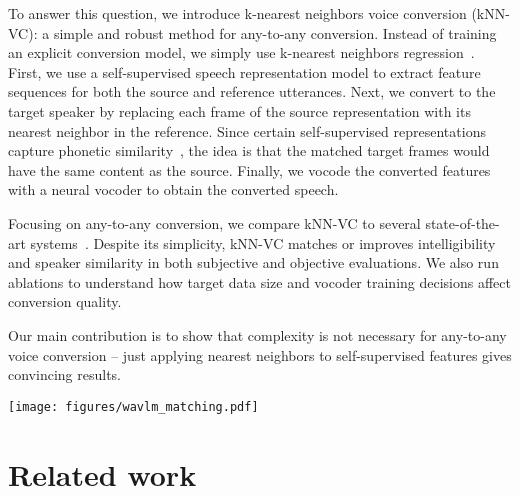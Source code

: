 \documentclass{INTERSPEECH2023}
\def\modelname{{kNN-VC}}
\begin{document}
To answer this question, we introduce k-nearest neighbors voice conversion (\modelname{}): a simple and robust method for any-to-any conversion.
Instead of training an explicit conversion model, we simply use k-nearest neighbors regression~\cite{knn_fix1985discriminatory}.
First, we use a self-supervised speech representation
model to extract feature sequences for both the source and reference utterances.
Next, we convert to the target speaker by replacing each frame of the source representation with its nearest neighbor in the reference.
Since certain self-supervised representations capture phonetic similarity~\cite{chen2022wavlm}, the idea is that the matched target frames would have the same content as the source.
Finally, we vocode the converted features with a neural vocoder to obtain the converted speech.




Focusing on any-to-any conversion, we compare \modelname{} to several state-of-the-art systems~\cite{freevc, vqmivc_wang21n_interspeech,yourtts_v162-casanova22a}.
Despite its simplicity, \modelname{} matches or improves intelligibility and speaker similarity in both subjective and objective evaluations. 
We also run ablations to understand how target data size and vocoder training decisions affect conversion quality.


Our main contribution is to show that complexity is not necessary for any-to-any voice conversion -- just applying nearest neighbors to self-supervised features gives convincing results.





\begin{figure*}[t!]
\centering
\centerline{\texttt{[image: figures/wavlm\_matching.pdf]}}
\caption{
    \modelname{}:
    The source and reference utterance(s) are encoded into self-supervised features from a pretrained WavLM model \cite{chen2022wavlm}.
    Each source feature is assigned to the mean of the $k$ closest features from the reference. 
    The resulting feature sequence is then vocoded using HiFi-GAN     to arrive at the converted waveform output.
}
\label{fig:1_model_arch}
\end{figure*}

\section{Related work}
\end{document}
